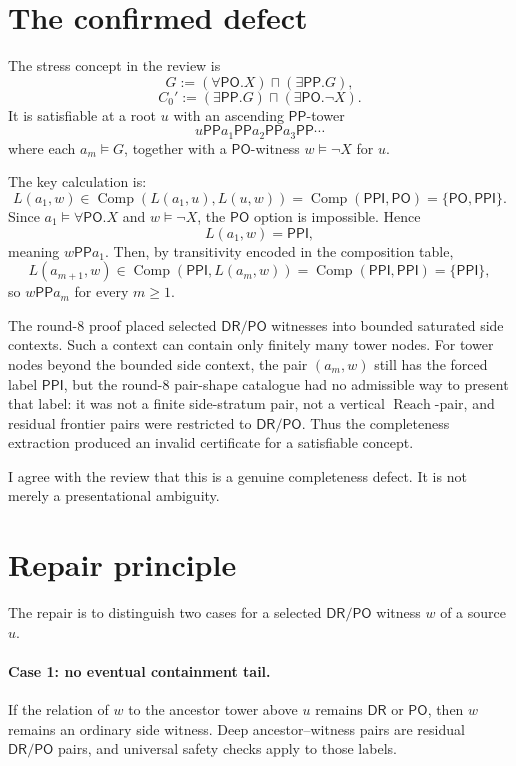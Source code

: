 \documentclass[11pt]{article}
\newcommand{\DR}{\mathsf{DR}}
\newcommand{\PO}{\mathsf{PO}}
\newcommand{\PP}{\mathsf{PP}}
\newcommand{\PPI}{\mathsf{PPI}}
\newcommand{\comp}{\operatorname{Comp}}
\newcommand{\Reach}{\operatorname{Reach}}
\begin{document}
\section{The confirmed defect}

The stress concept in the review is
\[
  G := (\forall\PO.X)\sqcap(\exists\PP.G),
\]
\[
  C_0' := (\exists\PP.G)\sqcap(\exists\PO.\neg X).
\]
It is satisfiable at a root \(u\) with an ascending \(\PP\)-tower
\[
  u\PP a_1\PP a_2\PP a_3\PP\cdots
\]
where each \(a_m\models G\), together with a \(\PO\)-witness \(w\models\neg X\) for \(u\).

The key calculation is:
\[
  L(a_1,w)\in \comp(L(a_1,u),L(u,w))
            = \comp(\PPI,\PO)
            = \{\PO,\PPI\}.
\]
Since \(a_1\models\forall\PO.X\) and \(w\models\neg X\), the \(\PO\) option is impossible.  Hence
\[
  L(a_1,w)=\PPI,
\]
meaning \(w\PP a_1\).  Then, by transitivity encoded in the composition table,
\[
  L(a_{m+1},w)\in \comp(\PPI,L(a_m,w))=\comp(\PPI,\PPI)=\{\PPI\},
\]
so \(w\PP a_m\) for every \(m\ge 1\).

The round-8 proof placed selected \(\DR/\PO\) witnesses into bounded saturated side contexts.  Such a context can contain only finitely many tower nodes.  For tower nodes beyond the bounded side context, the pair \((a_m,w)\) still has the forced label \(\PPI\), but the round-8 pair-shape catalogue had no admissible way to present that label: it was not a finite side-stratum pair, not a vertical \(\Reach\)-pair, and residual frontier pairs were restricted to \(\DR/\PO\).  Thus the completeness extraction produced an invalid certificate for a satisfiable concept.

I agree with the review that this is a genuine completeness defect.  It is not merely a presentational ambiguity.

\section{Repair principle}

The repair is to distinguish two cases for a selected \(\DR/\PO\) witness \(w\) of a source \(u\).

\paragraph{Case 1: no eventual containment tail.}
If the relation of \(w\) to the ancestor tower above \(u\) remains \(\DR\) or \(\PO\), then \(w\) remains an ordinary side witness.  Deep ancestor--witness pairs are residual \(\DR/\PO\) pairs, and universal safety checks apply to those labels.
\end{document}
